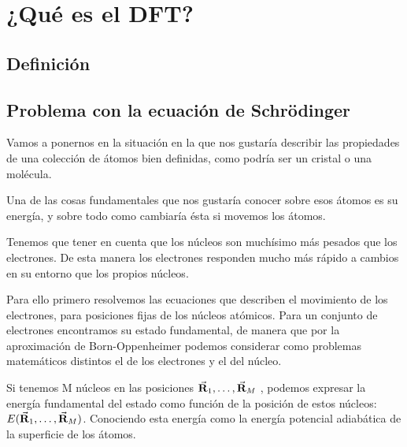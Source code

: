 \section{¿Qué es el DFT?}

\subsection{Definición}

\subsection{Problema con la ecuación de Schrödinger} 

Vamos a ponernos en la situación en la que nos gustaría describir las propiedades de una colección de átomos bien definidas, como podría ser un cristal o una molécula.

Una de las cosas fundamentales que nos gustaría conocer sobre esos átomos es su energía, y sobre todo como cambiaría ésta si movemos los átomos.

Tenemos que tener en cuenta que los núcleos son muchísimo más pesados que los electrones. De esta manera los electrones responden mucho más rápido a cambios en su entorno que los propios núcleos.

Para ello primero resolvemos las ecuaciones que describen el movimiento de los electrones, para posiciones fijas de los núcleos atómicos. Para un conjunto de electrones encontramos su estado fundamental, de manera que por la aproximación de Born-Oppenheimer podemos considerar como problemas matemáticos distintos el de los electrones y el del núcleo.

Si tenemos M núcleos en las posiciones $\va{R}_1 , \dots , \va{R}_M$ , podemos expresar la energía fundamental del estado como función de la posición de estos núcleos: $E(\va{R}_1 , \dots , \va{R}_M)$. Conociendo esta energía como la energía potencial adiabática de la superficie de los átomos.